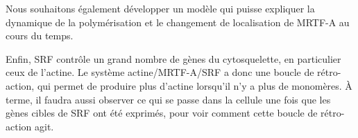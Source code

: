 Nous souhaitons également développer un modèle qui puisse expliquer la dynamique de la polymérisation et le changement de localisation de MRTF-A au cours du temps. 

Enfin, SRF contrôle un grand nombre de gènes du cytosquelette, en particulier ceux de l'actine. Le système actine/MRTF-A/SRF a donc une boucle de rétro-action, qui permet de produire plus d'actine lorsqu'il n'y a plus de monomères. À terme, il faudra aussi observer ce qui se passe dans la cellule une fois que les gènes cibles de SRF ont été exprimés, pour voir comment cette boucle de rétro-action agit. 






%
%